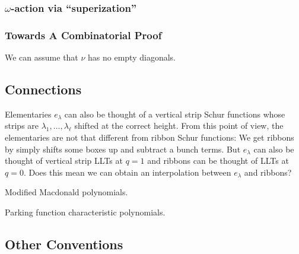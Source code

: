 \subsubsection{$\omega$-action via ``superization''}

\subsubsection{Towards A Combinatorial Proof}

We can assume that $\nu$ has no empty diagonals.

\subsection{Connections}
\label{sec:connections}

Elementaries $e_{\lambda}$ can also be thought of a vertical strip Schur
functions whose strips are $\lambda_{1}, \dots, \lambda_{\ell}$ shifted at the correct
height.  From this point of view, the elementaries are not that
different from ribbon Schur functions: We get ribbons by simply shifts
some boxes up and subtract a bunch terms.  But $e_{\lambda}$ can also be
thought of vertical strip LLTs at $q=1$ and ribbons can be thought of
LLTs at $q=0$.  Does this mean we can obtain an interpolation between
$e_{\lambda}$ and ribbons?

Modified Macdonald polynomials.

Parking function characteristic polynomials.

\subsection{Other Conventions}

